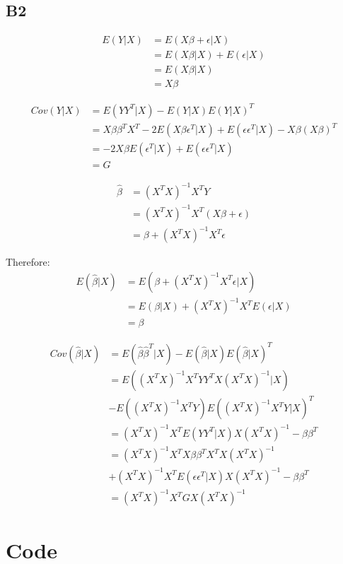 \documentclass[11pt]{article}\usepackage[]{graphicx}\usepackage[]{color}
\begin{document}
\subsection{B2}

\begin{align}
E(Y|X) &= E(X\beta+\epsilon|X) \\
&= E(X\beta|X)+E(\epsilon|X) \\
&= E(X\beta|X) \\
&= X\beta
\end{align}

\begin{align}
Cov(Y|X) &= E(YY^T|X) - E(Y|X)E(Y|X)^T \\
&= X\beta \beta^T X^T - 2 E(X\beta \epsilon^T|X)+E(\epsilon \epsilon^T|X) - X\beta(X\beta)^T \\
&= -2 X\beta E(\epsilon^T|X) + E(\epsilon \epsilon^T|X) \\
&= G
\end{align}

\begin{align}
\hat{\beta}  &= (X^TX)^{-1}X^TY \\
&= (X^TX)^{-1}X^T(X\beta+\epsilon) \\
&= \beta + (X^TX)^{-1}X^T \epsilon 
\end{align}

Therefore: 
\begin{align}
E(\hat{\beta} |X) &= E(\beta + (X^TX)^{-1}X^T \epsilon | X) \\
&= E(\beta |X) + (X^TX)^{-1}X^T E(\epsilon | X) \\
&= \beta
\end{align}

\begin{align}
Cov(\hat{\beta} |X) &= E(\hat{\beta}\hat{\beta}^T|X) - E(\hat{\beta}|X)E(\hat{\beta}|X)^T \\
&= E((X^TX)^{-1}X^TYY^TX(X^TX)^{-1}|X) \\ 
& -E((X^TX)^{-1}X^TY)E((X^TX)^{-1}X^TY|X)^T \\
&= (X^TX)^{-1}X^T E(Y Y^T|X) X(X^TX)^{-1}-\beta \beta^T \\
&= (X^TX)^{-1}X^TX\beta \beta^T X^T X(X^TX)^{-1} \\
& +(X^TX)^{-1}X^TE(\epsilon \epsilon^T|X)X(X^TX)^{-1} -\beta \beta^T \\
&= (X^TX)^{-1}X^T G X(X^TX)^{-1} 
\end{align}

\section{Code}
\end{document}

